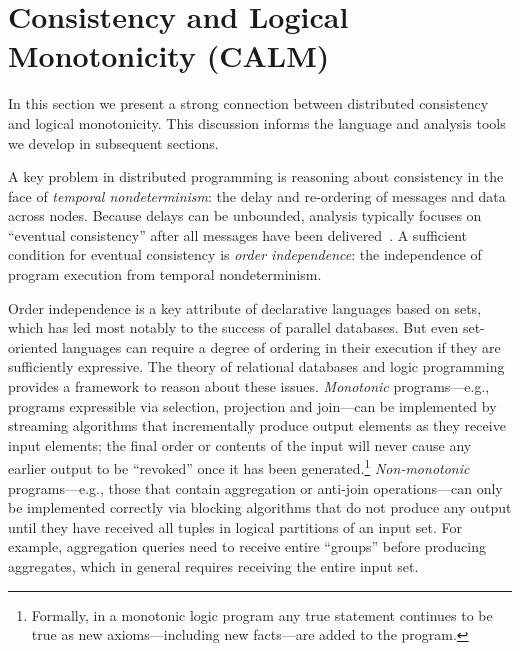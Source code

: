 \section{Consistency and Logical Monotonicity (CALM)}
In this section we present a strong connection between distributed consistency and logical monotonicity.  This discussion informs the language and analysis tools we develop in subsequent sections.

A key problem in distributed programming is reasoning about consistency in the face of {\em
temporal nondeterminism}: the delay and re-ordering of messages and data across
nodes.  Because delays can be unbounded, analysis typically focuses on ``eventual consistency'' after all messages have been delivered~\cite{vogels}.  A sufficient condition for eventual consistency is {\em order independence}: the independence of program execution from temporal
nondeterminism.

Order independence is a key attribute of declarative languages based on sets, which has led most notably to the success of parallel databases.  But even set-oriented languages can require a degree of ordering in their execution if they are sufficiently expressive.
The theory of relational databases and logic programming provides a framework to reason about these issues. \emph{Monotonic} programs---e.g., programs expressible via selection, projection and join---can be implemented by streaming algorithms that incrementally produce output elements as they receive input elements; the final order or contents of the input will never cause any earlier output to be ``revoked'' once it has been generated.\footnote{Formally, in a monotonic logic program any true statement continues to be true as new axioms---including new facts---are added to the program.}   
\emph{Non-monotonic} programs---e.g., those that contain aggregation or anti-join operations---can only be implemented correctly via blocking algorithms that do not produce any output until they have received all tuples in logical partitions of an input set. 
For example, aggregation queries need to receive entire ``groups'' before producing aggregates, which in general requires receiving the entire input set.

